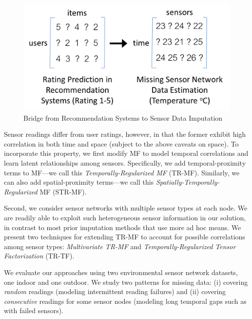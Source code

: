 \begin{figure}[H]
\centering
\includegraphics[scale=0.35]{recommend_imputation_timerow.png}
\caption{Bridge from Recommendation Systems to Sensor Data Imputation} 
\label{recommend_imputation}
\vspace{-0.1in}
\end{figure}

Sensor readings differ from user ratings, however, in that the former
exhibit high correlation in both time and space (subject to the above
caveats on space).  To incorporate this property, we first modify MF
to model temporal correlations and learn latent relationships among
sensors.  Specifically, we add temporal-proximity terms to
MF---we call this {\em Temporally-Regularized MF} (TR-MF). 
Similarly, we can also add spatial-proximity terms---we 
call this {\em Spatially-Temporally-Regularized} MF (STR-MF).

Second, we consider sensor networks with multiple sensor types at each node.
We are readily able to exploit such heterogeneous sensor information in our
solution, in contrast to most prior imputation methods that use more ad hoc means.
We present two techniques for extending 
TR-MF to account for possible correlations among sensor types: {\em Multivariate TR-MF} and 
{\em Temporally-Regularized Tensor Factorization} (TR-TF).

We evaluate our approaches using two environmental sensor network
datasets, one indoor and one outdoor.
We study two patterns for missing data: (i) covering
{\em random} readings (modeling intermittent reading failures) and (ii)
covering {\em consecutive} readings for some sensor nodes
(modeling long temporal gaps such as with failed sensors).

